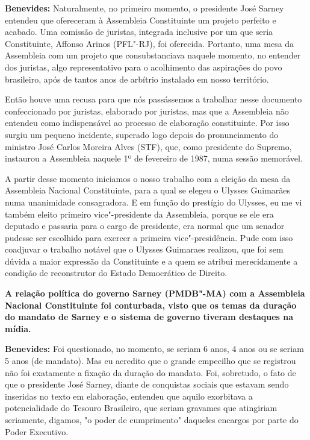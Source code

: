 \textbf{Benevides:} Naturalmente, no primeiro momento, o presidente José
Sarney entendeu que ofereceram à Assembleia Constituinte um projeto
perfeito e acabado. Uma comissão de juristas, integrada inclusive por um
que seria Constituinte, Affonso Arinos (PFL"-RJ), foi oferecida.
Portanto, uma mesa da Assembleia com um projeto que consubstanciava
naquele momento, no entender dos juristas, algo representativo para o
acolhimento das aspirações do povo brasileiro, após de tantos anos de
arbítrio instalado em nosso território.

Então houve uma recusa para que nós passássemos a trabalhar nesse
documento confeccionado por juristas, elaborado por juristas, mas que a
Assembleia não entendeu como indispensável ao processo de elaboração
constituinte. Por isso surgiu um pequeno incidente, superado logo depois
do pronunciamento do ministro José Carlos Moreira Alves (STF), que, como
presidente do Supremo, instaurou a Assembleia naquele 1º de fevereiro de
1987, numa sessão memorável.

A partir desse momento iniciamos o nosso trabalho com a eleição da mesa
da Assembleia Nacional Constituinte, para a qual se elegeu o Ulysses
Guimarães numa unanimidade consagradora. E em função do prestígio do
Ulysses, eu me vi também eleito primeiro vice"-presidente da Assembleia,
porque se ele era deputado e passaria para o cargo de presidente, era
normal que um senador pudesse ser escolhido para exercer a primeira
vice"-presidência. Pude com isso coadjuvar o trabalho notável que o
Ulysses Guimaraes realizou, que foi sem dúvida a maior expressão da
Constituinte e a quem se atribui merecidamente a condição de
reconstrutor do Estado Democrático de Direito.

\textbf{A relação política do governo Sarney (PMDB"-MA) com a Assembleia
Nacional Constituinte foi conturbada, visto que os temas da duração do
mandato de Sarney e o sistema de governo tiveram destaques na mídia.}

\textbf{Benevides:} Foi questionado, no momento, se seriam 6 anos, 4
anos ou se seriam 5 anos (de mandato). Mas eu acredito que o grande
empecilho que se registrou não foi exatamente a fixação da duração do
mandato. Foi, sobretudo, o fato de que o presidente José Sarney, diante
de conquistas sociais que estavam sendo inseridas no texto em
elaboração, entendeu que aquilo exorbitava a potencialidade do Tesouro
Brasileiro, que seriam gravames que atingiriam seriamente, digamos, "o
poder de cumprimento" daqueles encargos por parte do Poder Executivo.

